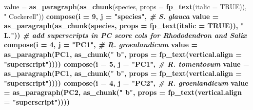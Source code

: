 \documentclass[
]{article}
\newenvironment{Shaded}{\begin{snugshade}}{\end{snugshade}}
\newcommand{\CommentTok}[1]{\textcolor[rgb]{0.56,0.35,0.01}{\textit{#1}}}
\newcommand{\DataTypeTok}[1]{\textcolor[rgb]{0.13,0.29,0.53}{#1}}
\newcommand{\DecValTok}[1]{\textcolor[rgb]{0.00,0.00,0.81}{#1}}
\newcommand{\KeywordTok}[1]{\textcolor[rgb]{0.13,0.29,0.53}{\textbf{#1}}}
\newcommand{\NormalTok}[1]{#1}
\newcommand{\OperatorTok}[1]{\textcolor[rgb]{0.81,0.36,0.00}{\textbf{#1}}}
\newcommand{\OtherTok}[1]{\textcolor[rgb]{0.56,0.35,0.01}{#1}}
\newcommand{\StringTok}[1]{\textcolor[rgb]{0.31,0.60,0.02}{#1}}
\begin{document}
\begin{Shaded}
\begin{Highlighting}[]
{{{{{{{{{{{{{{{{{{{{          \DataTypeTok{value =} \KeywordTok{as_paragraph}\NormalTok{(}\KeywordTok{as_chunk}\NormalTok{(species,}
                                        \DataTypeTok{props =} \KeywordTok{fp_text}\NormalTok{(}\DataTypeTok{italic =} \OtherTok{TRUE}\NormalTok{)),}
                               \StringTok{" Cockerell"}\NormalTok{)) }\OperatorTok{%>%}\StringTok{ }
\StringTok{  }\KeywordTok{compose}\NormalTok{(}\DataTypeTok{i =} \DecValTok{9}\NormalTok{, }\DataTypeTok{j =} \StringTok{"species"}\NormalTok{,   }\CommentTok{# S. glauca}
          \DataTypeTok{value =} \KeywordTok{as_paragraph}\NormalTok{(}\KeywordTok{as_chunk}\NormalTok{(species,}
                                        \DataTypeTok{props =} \KeywordTok{fp_text}\NormalTok{(}\DataTypeTok{italic =} \OtherTok{TRUE}\NormalTok{)),}
                               \StringTok{" L."}\NormalTok{)) }\OperatorTok{%>%}\StringTok{ }
\StringTok{  }
\StringTok{  }\CommentTok{# add superscripts in PC score cols for Rhododendron and Salix}
\StringTok{  }\KeywordTok{compose}\NormalTok{(}\DataTypeTok{i =} \DecValTok{4}\NormalTok{, }\DataTypeTok{j =} \StringTok{"PC1"}\NormalTok{,   }\CommentTok{# R. groenlandicum}
          \DataTypeTok{value =} \KeywordTok{as_paragraph}\NormalTok{(PC1,}
                               \KeywordTok{as_chunk}\NormalTok{(}\StringTok{" b"}\NormalTok{,}
                                        \DataTypeTok{props =} \KeywordTok{fp_text}\NormalTok{(}\DataTypeTok{vertical.align =} \StringTok{"superscript"}\NormalTok{)))) }\OperatorTok{%>%}\StringTok{ }
\StringTok{  }\KeywordTok{compose}\NormalTok{(}\DataTypeTok{i =} \DecValTok{5}\NormalTok{, }\DataTypeTok{j =} \StringTok{"PC1"}\NormalTok{,   }\CommentTok{# R. tomentosum}
          \DataTypeTok{value =} \KeywordTok{as_paragraph}\NormalTok{(PC1,}
                               \KeywordTok{as_chunk}\NormalTok{(}\StringTok{" b"}\NormalTok{,}
                                        \DataTypeTok{props =} \KeywordTok{fp_text}\NormalTok{(}\DataTypeTok{vertical.align =} \StringTok{"superscript"}\NormalTok{)))) }\OperatorTok{%>%}\StringTok{ }
\StringTok{  }\KeywordTok{compose}\NormalTok{(}\DataTypeTok{i =} \DecValTok{4}\NormalTok{, }\DataTypeTok{j =} \StringTok{"PC2"}\NormalTok{,   }\CommentTok{# R. groenlandicum}
          \DataTypeTok{value =} \KeywordTok{as_paragraph}\NormalTok{(PC2,}
                               \KeywordTok{as_chunk}\NormalTok{(}\StringTok{" b"}\NormalTok{,}
                                        \DataTypeTok{props =} \KeywordTok{fp_text}\NormalTok{(}\DataTypeTok{vertical.align =} \StringTok{"superscript"}\NormalTok{)))) }\OperatorTok{%>%}\StringTok{ }
}}}}}}}}}}}}}}}}}}}}}}}}}
\end{Highlighting}
\end{Shaded}
\end{document}
